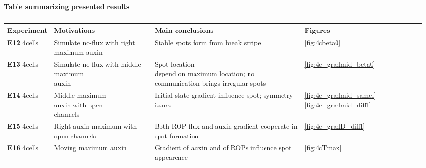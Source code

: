 \begin{table}[H]
  \caption*{\textbf{Table summarizing presented results}}
    \begin{tabular}{|p{3cm} |l l p{3cm}|}
    \hline
    \textbf{Experiment} & \textbf{Motivations} & \textbf{Main conclusions} & \textbf{Figures} \T\B \\
    \hline \hline
    \textbf{E12} 4cells & \parbox[t]{4cm}{Simulate no-flux with right maximum auxin  \T\B} & \parbox[t]{4cm}{Stable spots form from break stripe  \T\B} & \ref{fig:4cbeta0} \T\B\\
    \hline
    \textbf{E13} 4cells & \parbox[t]{4cm}{Simulate no-flux with middle maximum \\ auxin} & \parbox[t]{4cm}{Spot location \\ depend on maximum location; no communication brings irregular spots \T\B} & \ref{fig:4c_gradmid_beta0} \T\B\\
    \hline
    \textbf{E14} 4cells & \parbox[t]{4cm}{Middle maximum \\ auxin with open \\ channels \T\B} & \parbox[t]{4cm}{Initial state gradient influence spot; symmetry issues \T\B} & \ref{fig:4c_gradmid_sameI} - \ref{fig:4c_gradmid_diffI} \T\B\\
    \hline
    \textbf{E15} 4cells & \parbox[t]{4cm}{Right auxin maximum with open channels \T\B} & \parbox[t]{4cm}{Both ROP flux and auxin gradient cooperate in spot formation \T\B} & \ref{fig:4c_gradD_diffI} \T\B\\
    \hline
    \textbf{E16} 4cells & Moving maximum auxin  & \parbox[t]{4cm}{Gradient of auxin and of ROPs influence spot appearence \T\B} & \ref{fig:4cTmax} \T\B\\
    \hline
    \end{tabular}
    \\[10pt]
    \caption[Table summarizing RR results on 4 cells system]{}
    \label{table:4c_summaryRes}
\end{table}



